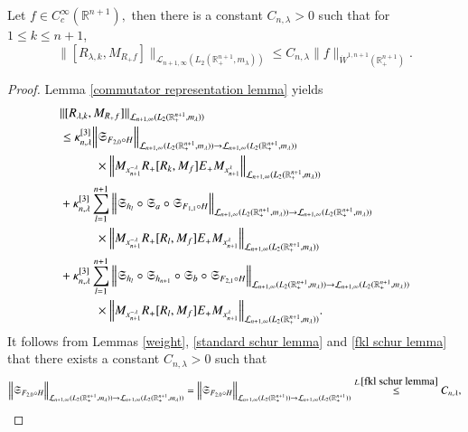 \documentclass[12pt]{amsart}
\begin{document}
\begin{lemma}\label{mta final lemma} Let $f\in C^{\infty}_c(\mathbb{R}^{n+1}),$ then there is a constant $C_{n,\lambda}>0$ such that for $1\leq k\leq n+1$,
$$\|[R_{\lambda,k},M_{R_+f}]\|_{\mathcal{L}_{n+1,\infty}(L_2(\mathbb{R}^{n+1}_+,m_{\lambda}))}\leq C_{n,\lambda}\|f\|_{\dot{W}^{1,n+1}(\mathbb{R}_+^{n+1})}.$$
\end{lemma}
\begin{proof} Lemma \ref{commutator representation lemma} yields
\begin{align*}
&\|[R_{\lambda,k},M_{R_+f}]\|_{\mathcal{L}_{n+1,\infty}(L_2(\mathbb{R}^{n+1}_+,m_{\lambda}))}\\
&\leq \kappa_{n,\lambda}^{[3]}\Big\|\mathfrak{S}_{F_{2,0}\circ H}\Big\|_{\mathcal{L}_{n+1,\infty}(L_2(\mathbb{R}^{n+1}_+,m_{\lambda}))\to \mathcal{L}_{n+1,\infty}(L_2(\mathbb{R}^{n+1}_+,m_{\lambda}))}\\
&\hspace{1.0cm}\times\Big\| M_{x_{n+1}^{-\lambda}} R_+[R_k,M_f]E_+ M_{x_{n+1}^{\lambda}}\Big\|_{\mathcal{L}_{n+1,\infty}(L_2(\mathbb{R}^{n+1}_+,m_{\lambda}))}\\
&+\kappa_{n,\lambda}^{[3]}\sum_{l=1}^{n+1}\Big\|\mathfrak{S}_{h_l}\circ\mathfrak{S}_a\circ\mathfrak{S}_{F_{1,1}\circ H}\Big\|_{\mathcal{L}_{n+1,\infty}(L_2(\mathbb{R}^{n+1}_+,m_{\lambda}))\to \mathcal{L}_{n+1,\infty}(L_2(\mathbb{R}^{n+1}_+,m_{\lambda}))}\\
&\hspace{1.0cm}\times\Big\|M_{x_{n+1}^{-\lambda}} R_+[R_l,M_f]E_+ M_{x_{n+1}^{\lambda}}\Big\|_{\mathcal{L}_{n+1,\infty}(L_2(\mathbb{R}^{n+1}_+,m_{\lambda}))}\\
&+\kappa_{n,\lambda}^{[3]}\sum_{l=1}^{n+1}\Big\|\mathfrak{S}_{h_l}\circ\mathfrak{S}_{h_{n+1}}\circ\mathfrak{S}_b\circ\mathfrak{S}_{F_{2,1}\circ H}\Big\|_{\mathcal{L}_{n+1,\infty}(L_2(\mathbb{R}^{n+1}_+,m_{\lambda}))\to \mathcal{L}_{n+1,\infty}(L_2(\mathbb{R}^{n+1}_+,m_{\lambda}))}\\
&\hspace{1.0cm}\times\Big\|M_{x_{n+1}^{-\lambda}} R_+[R_l,M_f]E_+ M_{x_{n+1}^{\lambda}}\Big\|_{\mathcal{L}_{n+1,\infty}(L_2(\mathbb{R}^{n+1}_+,m_{\lambda}))}.
\end{align*}
It follows from Lemmas \ref{weight}, \ref{standard schur lemma} and \ref{fkl schur lemma} that there exists a constant $C_{n,\lambda}>0$ such that
$$\Big\|\mathfrak{S}_{F_{2,0}\circ H}\Big\|_{\mathcal{L}_{n+1,\infty}(L_2(\mathbb{R}^{n+1}_+,m_{\lambda}))\to \mathcal{L}_{n+1,\infty}(L_2(\mathbb{R}^{n+1}_+,m_{\lambda}))}=\Big\|\mathfrak{S}_{F_{2,0}\circ H}\Big\|_{\mathcal{L}_{n+1,\infty}(L_2(\mathbb{R}^{n+1}_+))\to \mathcal{L}_{n+1,\infty}(L_2(\mathbb{R}^{n+1}_+))}\stackrel{L.\ref{fkl schur lemma}}{\leq}{C_{n,\lambda}},$$

\end{proof}
\end{document}
